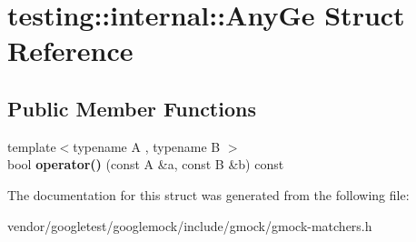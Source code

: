 \hypertarget{structtesting_1_1internal_1_1AnyGe}{}\section{testing\+:\+:internal\+:\+:Any\+Ge Struct Reference}
\label{structtesting_1_1internal_1_1AnyGe}
\subsection*{Public Member Functions}
\begin{DoxyCompactItemize}
\item 
{\footnotesize template$<$typename A , typename B $>$ }\\bool {\bfseries operator()} (const A \&a, const B \&b) const \hypertarget{structtesting_1_1internal_1_1AnyGe_a03bd089e156ed1913842938d7058d5ff}{}\label{structtesting_1_1internal_1_1AnyGe_a03bd089e156ed1913842938d7058d5ff}

\end{DoxyCompactItemize}


The documentation for this struct was generated from the following file\+:\begin{DoxyCompactItemize}
\item 
vendor/googletest/googlemock/include/gmock/gmock-\/matchers.\+h\end{DoxyCompactItemize}

